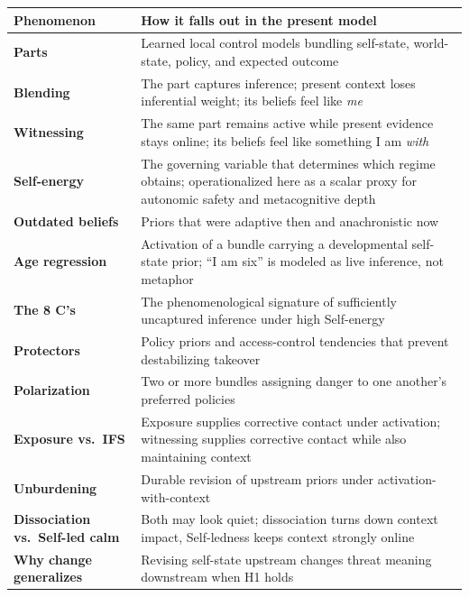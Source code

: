 \documentclass[11pt,a4paper]{article}
\newcounter{none}
\begin{document}
{\def\LTcaptype{none} %
\begin{longtable}[]{@{}
  >{\raggedright\arraybackslash}p{}
  >{\raggedright\arraybackslash}p{}@{}}
\toprule\noalign{}
\begin{minipage}[b]{\linewidth}\raggedright
Phenomenon
\end{minipage} & \begin{minipage}[b]{\linewidth}\raggedright
How it falls out in the present model
\end{minipage} \\
\midrule\noalign{}
\endhead
\bottomrule\noalign{}
\endlastfoot
\textbf{Parts} & Learned local control models bundling self-state,
world-state, policy, and expected outcome \\
\textbf{Blending} & The part captures inference; present context loses
inferential weight; its beliefs feel like \emph{me} \\
\textbf{Witnessing} & The same part remains active while present
evidence stays online; its beliefs feel like something I am
\emph{with} \\
\textbf{Self-energy} & The governing variable that determines which
regime obtains; operationalized here as a scalar proxy for autonomic
safety and metacognitive depth \\
\textbf{Outdated beliefs} & Priors that were adaptive then and
anachronistic now \\
\textbf{Age regression} & Activation of a bundle carrying a
developmental self-state prior; ``I am six'' is modeled as live
inference, not metaphor \\
\textbf{The 8 C's} & The phenomenological signature of sufficiently
uncaptured inference under high Self-energy \\
\textbf{Protectors} & Policy priors and access-control tendencies that
prevent destabilizing takeover \\
\textbf{Polarization} & Two or more bundles assigning danger to one
another's preferred policies \\
\textbf{Exposure vs.~IFS} & Exposure supplies corrective contact under
activation; witnessing supplies corrective contact while also
maintaining context \\
\textbf{Unburdening} & Durable revision of upstream priors under
activation-with-context \\
\textbf{Dissociation vs.~Self-led calm} & Both may look quiet;
dissociation turns down context impact, Self-ledness keeps context
strongly online \\
\textbf{Why change generalizes} & Revising self-state upstream changes
threat meaning downstream when H1 holds \\
\end{longtable}
}
\end{document}

